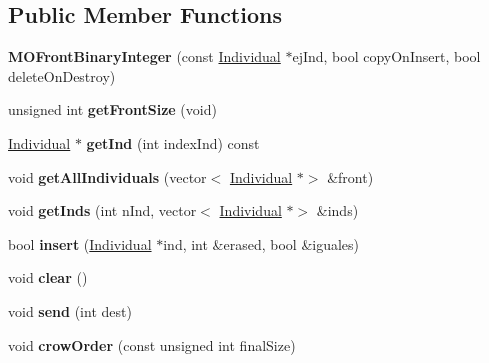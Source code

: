 \subsection*{Public Member Functions}
\begin{DoxyCompactItemize}
\item 
\mbox{\label{classMOFrontBinaryInteger_a5236a5002cc410e8dec597c12256f6b0}} 
{\bfseries M\+O\+Front\+Binary\+Integer} (const \mbox{\hyperlink{classIndividual}{Individual}} $\ast$ej\+Ind, bool copy\+On\+Insert, bool delete\+On\+Destroy)
\item 
\mbox{\label{classMOFrontBinaryInteger_a3c38e6b6e8beb50b43a46863afdf2234}} 
unsigned int {\bfseries get\+Front\+Size} (void)
\item 
\mbox{\label{classMOFrontBinaryInteger_aff530861f58e5073109fc63822fc68ba}} 
\mbox{\hyperlink{classIndividual}{Individual}} $\ast$ {\bfseries get\+Ind} (int index\+Ind) const
\item 
\mbox{\label{classMOFrontBinaryInteger_a3aebfdcab8b576f41e8ae9b03fdec4f2}} 
void {\bfseries get\+All\+Individuals} (vector$<$ \mbox{\hyperlink{classIndividual}{Individual}} $\ast$$>$ \&front)
\item 
\mbox{\label{classMOFrontBinaryInteger_a89e37b3811333af72d1ade0e3e9a429a}} 
void {\bfseries get\+Inds} (int n\+Ind, vector$<$ \mbox{\hyperlink{classIndividual}{Individual}} $\ast$$>$ \&inds)
\item 
\mbox{\label{classMOFrontBinaryInteger_a09556773bf768ab014ad4fc66a9a5ebe}} 
bool {\bfseries insert} (\mbox{\hyperlink{classIndividual}{Individual}} $\ast$ind, int \&erased, bool \&iguales)
\item 
\mbox{\label{classMOFrontBinaryInteger_a0c27eeaf5d77b5a934283cd9b42db990}} 
void {\bfseries clear} ()
\item 
\mbox{\label{classMOFrontBinaryInteger_ad0a4e91b4ce764989e4cff751a1cebc0}} 
void {\bfseries send} (int dest)
\item 
\mbox{\label{classMOFrontBinaryInteger_ad154fc956fd7763c22e2d6240e98ace0}} 
void {\bfseries crow\+Order} (const unsigned int final\+Size)
\end{DoxyCompactItemize}

